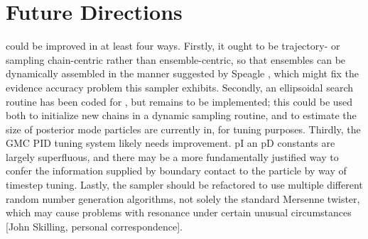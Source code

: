 \section{Future Directions}

 could be improved in at least four ways. Firstly, it ought to be trajectory- or sampling chain-centric rather than ensemble-centric, so that ensembles can be dynamically assembled in the manner suggested by Speagle \cite{Speagle2019}, which might fix the evidence accuracy problem this sampler exhibits. Secondly, an ellipsoidal search routine has been coded for , but remains to be implemented; this could be used both to initialize new chains in a dynamic sampling routine, and to estimate the size of posterior mode particles are currently in, for tuning purposes. Thirdly, the GMC PID tuning system likely needs improvement. pI an pD constants are largely superfluous, and there may be a more fundamentally justified way to confer the information supplied by boundary contact to the particle by way of timestep tuning. Lastly, the sampler should be refactored to use multiple different random number generation algorithms, not solely the standard Mersenne twister, which may cause problems with resonance under certain unusual circumstances [John Skilling, personal correspondence].